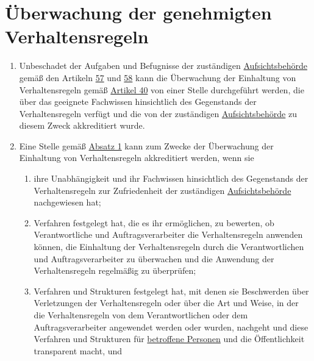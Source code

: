 \chapter{Überwachung der genehmigten Verhaltensregeln}
\label{ch:41}


\begin{enumerate}

  \item Unbeschadet der Aufgaben und Befugnisse der zuständigen \hyperref[itm:04-21]{Aufsichtsbehörde} gemäß den Artikeln \hyperref[ch:57]
   {57} und \hyperref[ch:58]{58} kann die Überwachung der Einhaltung von Verhaltensregeln gemäß \hyperref[ch:40]
   {Artikel 40} von einer Stelle durchgeführt werden, die über das geeignete Fachwissen hinsichtlich des Gegenstands
   der Verhaltensregeln verfügt und die von der zuständigen \hyperref[itm:04-21]{Aufsichtsbehörde} zu diesem Zweck akkreditiert wurde.
  \label{itm:41-1}

  \item Eine Stelle gemäß \hyperref[itm:41-1]{Absatz 1} kann zum Zwecke der Überwachung der Einhaltung von
   Verhaltensregeln akkreditiert werden, wenn sie
  \label{itm:41-2}

  \begin{enumerate}
  
    \item ihre Unabhängigkeit und ihr Fachwissen hinsichtlich des Gegenstands der Verhaltensregeln zur Zufriedenheit der
     zuständigen \hyperref[itm:04-21]{Aufsichtsbehörde} nachgewiesen hat;
    \label{itm:41-2a}

    \item Verfahren festgelegt hat, die es ihr ermöglichen, zu bewerten, ob Verantwortliche und Auftragsverarbeiter die
     Verhaltensregeln anwenden können, die Einhaltung der Verhaltensregeln durch die Verantwortlichen und
     Auftragsverarbeiter zu überwachen und die Anwendung der Verhaltensregeln regelmäßig zu überprüfen;
    \label{itm:41-2b}

    \item Verfahren und Strukturen festgelegt hat, mit denen sie Beschwerden über Verletzungen der Verhaltensregeln oder
     über die Art und Weise, in der die Verhaltensregeln von dem Verantwortlichen oder dem Auftragsverarbeiter
     angewendet werden oder wurden, nachgeht und diese Verfahren und Strukturen für \hyperref[itm:04-1]{betroffene Personen} und die
     Öffentlichkeit transparent macht, und
    \label{itm:41-2c}


\end{enumerate}
\end{enumerate}
